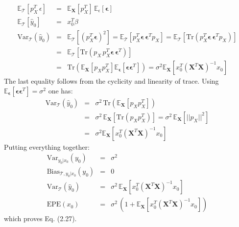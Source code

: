 \begin{eqnarray*}
	\mathbb{E}_{\mathcal{T}} \left[ p_X^T\, \epsilon\right] & = & \mathbb{E}_\mathbf{X}
	\left[p_X^T\right]\, \mathbb{E}_\epsilon \left[\bm{\epsilon}\right] \\
	\mathbb{E}_{\mathcal{T}}\left[\hat{y}_0 \right] & = & x_0 ^T \beta\\
	\textrm{Var}_\mathcal{T}(\hat{y}_0) & = & \mathbb{E}_{\mathcal{T}}\left[ (p_X^T \bm{\epsilon})^2\right] = \mathbb{E} _\mathcal{T}\left[p_X^T \bm{\epsilon} \, \bm{\epsilon}^T p_X \right] = \mathbb{E} _\mathcal{T}\left[\textrm{Tr} \left(p_X^T \bm{\epsilon} \, \bm{\epsilon}^T p_X \right)\right]\\
	& = & \mathbb{E} _\mathcal{T}\left[\textrm{Tr} \left(p_X\, p_X^T \bm{\epsilon} \, \bm{\epsilon}^T \right)\right] \\
	& = & \textrm{Tr} \left(	
	\mathbb{E}_\mathbf{X} \left[ p_X p_X^T \right] \mathbb{E}_{\bm{\epsilon}} \left[\bm{\epsilon} \bm{\epsilon}^T \right]\right) = \sigma ^2 \mathbb{E}_\mathbf{X} \left[x_0^T (\mathbf{X}^T \mathbf{X})^{-1} x_0 \right]
\end{eqnarray*}
The last equality follows from the cyclicity and linearity of trace. Using 
$\mathbb{E}_{\bm{\epsilon}} \left[\bm{\epsilon} \bm{\epsilon}^T \right] = \sigma^2$ one
has:
\begin{eqnarray*}
\textrm{Var}_\mathcal{T}(\hat{y}_0) & = & \sigma^2 \,\textrm{Tr} \left(	
	\mathbb{E}_\mathbf{X} \left[ p_X p_X^T \right] \right) \\
& = & \sigma^2 \, \mathbb{E}_\mathbf{X} \left[ \textrm{Tr}\left(p_X p_X^T \right)\right] 
 	= \sigma^2 \, \mathbb{E}_\mathbf{X} \left[ ||p_X||^2 \right]\\
& = & \sigma ^2 \mathbb{E}_\mathbf{X} \left[x_0^T (\mathbf{X}^T \mathbf{X})^{-1} x_0 
	\right]
\end{eqnarray*}
Putting everything together:
\begin{eqnarray*}
\textrm{Var}_{y_0 | x_0} (y_0) & = & \sigma^2\\
\textrm{Bias}_{\mathcal{T}, y_0 | x_0}(y_0) & = & 0\\
\textrm{Var}_\mathcal{T}(\hat{y}_0) & = & \sigma ^2\, \mathbb{E}_\mathbf{X} \left[x_0^T 
	(\mathbf{X}^T \mathbf{X})^{-1} x_0 \right]\\
\textrm{EPE}(x_0) & = & \sigma^2\, \left( 1 + \mathbb{E}_\mathbf{X} \left[x_0^T 
	(\mathbf{X}^T \mathbf{X})^{-1} x_0 \right] \right)
\end{eqnarray*} 
which proves Eq. (2.27).

